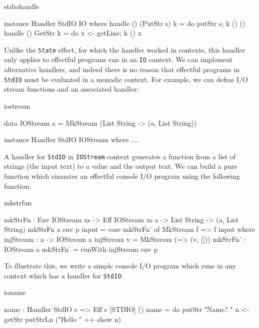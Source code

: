 \begin{SaveVerbatim}{stdiohandle}

instance Handler StdIO IO where
    handle () (PutStr s) k = do putStr s; k () ()
    handle () GetStr     k = do x <- getLine; k () x 

\end{SaveVerbatim}

\noindent
Unlike the \texttt{State} effect, for which the handler worked in 
contexts, this handler only applies to effectful programs run in an \texttt{IO}
context. We can implement alternative handlers, and indeed there is no
reason that effectful programs in \texttt{StdIO} must be evaluated in a monadic
context. For example, we can define I/O stream functions and an associated
handler:

\begin{SaveVerbatim}{iostream}

data IOStream a 
   = MkStream (List String -> (a, List String))

instance Handler StdIO IOStream where
    ....

\end{SaveVerbatim}

\noindent
A handler for \texttt{StdIO} in \texttt{IOStream} context generates a function
from a list of strings (the input text) to a value and the output text. We
can build a pure function which simuates an effectful console I/O program
using the following function:

\begin{SaveVerbatim}{mkstrfun}

mkStrFn : Env IOStream xs -> Eff IOStream xs a -> 
          List String -> (a, List String)
mkStrFn {a} env p input = case mkStrFn' of
                               MkStream f => f input
  where injStream : a -> IOStream a
        injStream v = MkStream (\x => (v, []))
        mkStrFn' : IOStream a
        mkStrFn' = runWith injStream env p

\end{SaveVerbatim}

\noindent
To illustrate this, we write a simple console I/O program which runs in
any context which has a handler for \texttt{StdIO}:

\begin{SaveVerbatim}{ioname}

name : Handler StdIO e => Eff e [STDIO] ()
name = do putStr "Name? "
          n <- getStr
          putStrLn ("Hello " ++ show n)

\end{SaveVerbatim}

